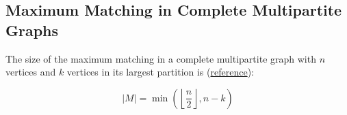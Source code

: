 \subsection{Maximum Matching in Complete Multipartite Graphs}

The size of the maximum matching in a complete multipartite graph with $n$ vertices and $k$ vertices in its largest partition is (\href{http://math.furman.edu/~mwoodard/fuejum/content/1996/1996paper2.pdf}{reference}):

$$ |M| = \min\left(\left\lfloor \frac{n}{2} \right\rfloor, n - k\right) $$
